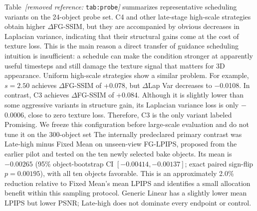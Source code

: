 \documentclass[times,twocolumn,final]{elsarticle}
\providecommand{\DIFadd}[1]{{\protect\color{blue} \sf #1}} %
\providecommand{\DIFdel}[1]{{\protect\color{red} \scriptsize #1}} %
\providecommand{\DIFaddbegin}{} %
\providecommand{\DIFaddend}{} %
\providecommand{\DIFdelbegin}{} %
\providecommand{\DIFdelend}{} %
\begin{document}
\DIFdelbegin \DIFdel{Table~\textit{[removed reference: }\texttt{tab:probe}\textit{]} summarizes representative scheduling variants on the 24-object probe set.
C4 and other late-stage high-scale strategies obtain higher $\Delta$FG-SSIM, but they are accompanied by obvious decreases in Laplacian variance, indicating that their structural gains come at the cost of texture loss. This is the main reason a direct transfer of guidance scheduling intuition is insufficient: a schedule can make the condition stronger at apparently useful timesteps and still damage the texture signal that matters for 3D appearance. Uniform high-scale strategies show a similar problem. For example, $s = 2.50$ achieves $\Delta$FG-SSIM of +0.078, but $\Delta$Lap Var decreases to $-$0.0108. In contrast, C3 achieves $\Delta$FG-SSIM of +0.084. Although it is slightly lower than some aggressive variants in structure gain, its Laplacian variance loss is only $-$0.0006, close to zero texture loss. Therefore, C3 is the only variant labeled Promising. We freeze this configuration before large-scale evaluation and do not tune it on the 300-object set}\DIFdelend \DIFaddbegin \DIFadd{The internally predeclared primary contrast was Late-high minus Fixed Mean on unseen-view FG-LPIPS, proposed from the earlier pilot and tested on the ten newly selected bake objects. Its mean is $-0.00265$ (95\% object-bootstrap CI $[-0.00414,-0.00137]$; exact paired sign-flip $p=0.00195$), with all ten objects favorable. This is an approximately 2.0\% reduction relative to Fixed Mean's mean LPIPS and identifies a small allocation benefit within this sampling protocol. Generic Linear has a slightly lower mean LPIPS but lower PSNR; Late-high does not dominate every endpoint or control}\DIFaddend .
\end{document}
